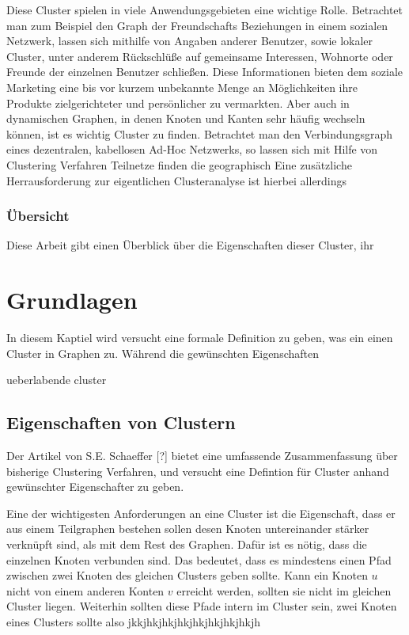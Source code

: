 \documentclass[journal]{vgtc}
\begin{document}
  Diese Cluster spielen in viele Anwendungsgebieten eine wichtige Rolle. 
  Betrachtet man zum Beispiel den Graph der Freundschafts Beziehungen in einem sozialen Netzwerk,
  lassen sich mithilfe von Angaben anderer Benutzer, sowie lokaler Cluster, unter anderem Rückschlüße 
  auf gemeinsame Interessen, Wohnorte oder Freunde der einzelnen Benutzer schließen.
  Diese Informationen bieten dem soziale Marketing eine bis vor kurzem unbekannte Menge
  an Möglichkeiten ihre Produkte zielgerichteter und persönlicher zu vermarkten.
  Aber auch in dynamischen Graphen, in denen Knoten und Kanten sehr häufig wechseln können,
  ist es wichtig Cluster zu finden. Betrachtet man den Verbindungsgraph eines dezentralen, 
  kabellosen Ad-Hoc Netzwerks, so lassen sich mit Hilfe von Clustering Verfahren 
  Teilnetze finden die geographisch
  Eine zusätzliche Herrausforderung zur eigentlichen Clusteranalyse ist hierbei allerdings
  
  \subsubsection*{Übersicht}
  Diese Arbeit gibt einen Überblick über die Eigenschaften dieser Cluster, ihr

\section{Grundlagen}
  In diesem Kaptiel wird versucht eine formale Definition zu geben, was ein einen Cluster in Graphen zu. 
  Während die gewünschten Eigenschaften
  
  ueberlabende cluster
  \subsection{Eigenschaften von Clustern}
  Der Artikel von S.E. Schaeffer [?] bietet eine umfassende Zusammenfassung
  über bisherige Clustering Verfahren, und versucht eine Defintion für 
  Cluster anhand gewünschter Eigenschafter zu geben.
  
  Eine der wichtigesten Anforderungen an eine Cluster ist die Eigenschaft, dass
  er aus einem Teilgraphen bestehen sollen desen Knoten untereinander stärker
  verknüpft sind, als mit dem Rest des Graphen. Dafür ist es nötig, dass
  die einzelnen Knoten verbunden sind. Das bedeutet, dass es mindestens
  einen Pfad zwischen zwei Knoten des gleichen Clusters geben sollte. Kann
  ein Knoten $u$ nicht von einem anderen Konten $v$ erreicht werden, sollten sie
  nicht im gleichen Cluster liegen. Weiterhin sollten diese Pfade intern im
  Cluster sein, zwei Knoten eines Clusters sollte also jkkjhkjhkjhkjhkjhkjhkjhkjh
  
\end{document}
